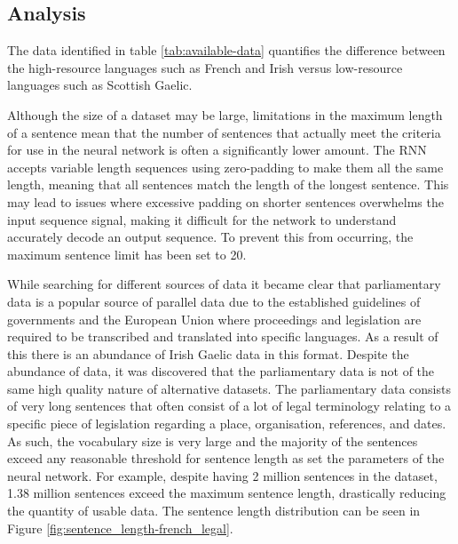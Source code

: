 \subsection{Analysis}

The data identified in table \ref{tab:available-data} quantifies the difference between the high-resource languages such as French and Irish versus low-resource languages such as Scottish Gaelic. 



Although the size of a dataset may be large, limitations in the maximum length of a sentence mean that the number of sentences that actually meet the criteria for use in the neural network is often a significantly lower amount. The RNN accepts variable length sequences using zero-padding to make them all the same length, meaning that all sentences match the length of the longest sentence. This may lead to issues where excessive padding on shorter sentences overwhelms the input sequence signal, making it difficult for the network to understand accurately decode an output sequence. To prevent this from occurring, the maximum sentence limit has been set to 20.

While searching for different sources of data it became clear that parliamentary data is a popular source of parallel data due to the established guidelines of governments and the European Union where proceedings and legislation are required to be transcribed and translated into specific languages. As a result of this there is an abundance of Irish Gaelic data in this format. Despite the abundance of data, it was discovered that the parliamentary data is not of the same high quality nature of alternative datasets. The parliamentary data consists of very long sentences that often consist of a lot of legal terminology relating to a specific piece of legislation regarding a place, organisation, references, and dates. 
As such, the vocabulary size is very large and the majority of the sentences exceed any reasonable threshold for sentence length as set the parameters of the neural network. For example, despite having 2 million sentences in the \cite{french_corpus_2005} dataset, 1.38 million sentences exceed the maximum sentence length, drastically reducing the quantity of usable data. The sentence length distribution can be seen in Figure \ref{fig:sentence_length-french_legal}.


